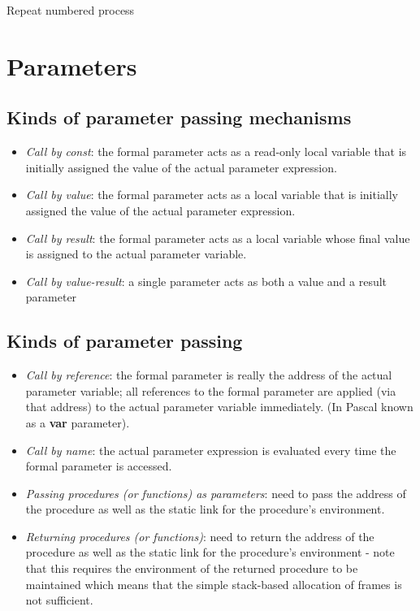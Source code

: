 \documentclass[fontsize=10pt,a4paper]{article}
\begin{document}
\begin{multicols}{3}
\begin{enumerate}
    Repeat numbered process

    \end{enumerate}

    \section{Parameters}

    \subsection{Kinds of parameter passing mechanisms}

    \begin{itemize}
        \item \textit{Call by const}: the formal parameter acts as a read-only local variable that is initially assigned the value of the actual parameter expression.
        \item \textit{Call by value}: the formal parameter acts as a local variable that is initially assigned the value of the actual parameter expression.
        \item \textit{Call by result}: the formal parameter acts as a local variable whose final value is assigned to the actual parameter variable.
        \item \textit{Call by value-result}: a single parameter acts as both a value and a result parameter
    \end{itemize}

    \subsection{Kinds of parameter passing}

    \begin{itemize}
        \item \textit{Call by reference}: the formal parameter is really the address of the actual parameter variable; all references to the formal parameter are applied (via that address) to the actual parameter variable immediately. (In Pascal known as a \textbf{var} parameter).
        \item \textit{Call by name}: the actual parameter expression is evaluated every time the formal parameter is accessed.
        \item \textit{Passing procedures (or functions) as parameters}: need to pass the address of the procedure as well as the static link for the procedure’s environment.
        \item \textit{Returning procedures (or functions)}: need to return the address of the procedure as well as the static link for the procedure’s environment - note that this requires the environment of the returned procedure to be maintained which means that the simple stack-based allocation of frames is not sufficient.


\end{itemize}
\end{multicols}
\end{document}
